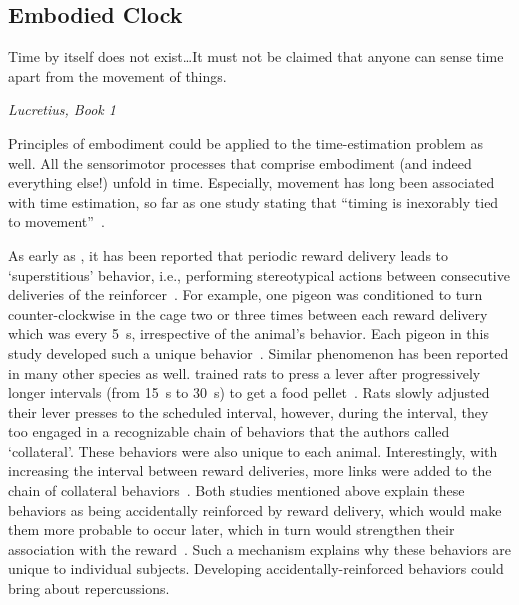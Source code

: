 \subsection{Embodied Clock}
\label{ch:intro:EmbodiedClock}
\epigraph{Time by itself does not exist\ldots It must not be claimed that anyone can sense time apart from the movement of things.}
{\textit{Lucretius, Book 1}}
\noindent
Principles of embodiment could be applied to the time-estimation problem as well.
All the sensorimotor processes that comprise embodiment (and indeed everything else!) unfold in time.
Especially, movement has long been associated with time estimation, so far as one study stating that ``timing is inexorably tied to movement''~\cite{Wiener2019eNeuro}.\footnotemark
{}
\par
As early as \citeyear{Skinner1948}, it has been reported that periodic reward delivery leads to `superstitious' behavior, i.e., performing stereotypical actions between consecutive deliveries of the reinforcer~\cite{Skinner1948}.
For example, one pigeon was conditioned to turn counter-clockwise in the cage two or three times between each reward delivery which was every 5~s, irrespective of the animal's behavior.
Each pigeon in this study developed such a unique behavior~\cite{Skinner1948}.
Similar phenomenon has been reported in many other species as well.
 trained rats to press a lever after progressively longer intervals (from 15~s to 30~s) to get a food pellet~\cite{Wilson1953}.
Rats slowly adjusted their lever presses to the scheduled interval, however, during the interval, they too engaged in a recognizable chain of behaviors that the authors called `collateral'.
These behaviors were also unique to each animal.
Interestingly, with increasing the interval between reward deliveries, more links were added to the chain of collateral behaviors~\cite{Wilson1953}.
Both studies mentioned above explain these behaviors as being accidentally reinforced by reward delivery, which would make them more probable to occur later, which in turn would strengthen their association with the reward~\cite{Killeen1988}.
Such a mechanism explains why these behaviors are unique to individual subjects.
Developing accidentally-reinforced behaviors could bring about repercussions.
